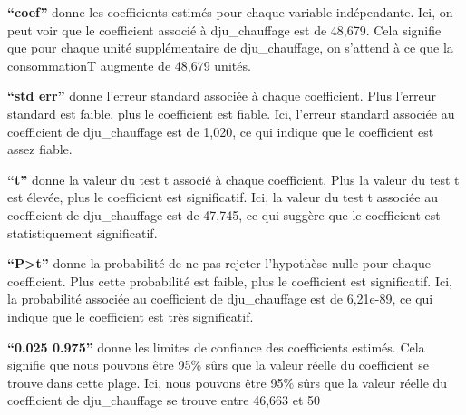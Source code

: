 \documentclass[11pt]{article}
\begin{document}
\textbf{``coef''} donne les coefficients estimés pour chaque variable
indépendante. Ici, on peut voir que le coefficient associé à
dju\_chauffage est de 48,679. Cela signifie que pour chaque unité
supplémentaire de dju\_chauffage, on s'attend à ce que la consommationT
augmente de 48,679 unités.

\textbf{``std err''} donne l'erreur standard associée à chaque
coefficient. Plus l'erreur standard est faible, plus le coefficient est
fiable. Ici, l'erreur standard associée au coefficient de dju\_chauffage
est de 1,020, ce qui indique que le coefficient est assez fiable.

\textbf{``t''} donne la valeur du test t associé à chaque coefficient.
Plus la valeur du test t est élevée, plus le coefficient est
significatif. Ici, la valeur du test t associée au coefficient de
dju\_chauffage est de 47,745, ce qui suggère que le coefficient est
statistiquement significatif.

\textbf{``P\textgreater\textbar t\textbar{}''} donne la probabilité de
ne pas rejeter l'hypothèse nulle pour chaque coefficient. Plus cette
probabilité est faible, plus le coefficient est significatif. Ici, la
probabilité associée au coefficient de dju\_chauffage est de 6,21e-89,
ce qui indique que le coefficient est très significatif.

\textbf{``0.025 0.975''} donne les limites de confiance des coefficients
estimés. Cela signifie que nous pouvons être 95\% sûrs que la valeur
réelle du coefficient se trouve dans cette plage. Ici, nous pouvons être
95\% sûrs que la valeur réelle du coefficient de dju\_chauffage se
trouve entre 46,663 et 50
\end{document}
